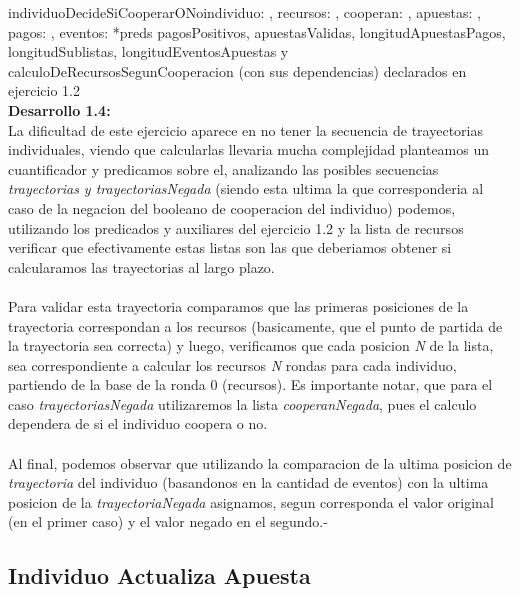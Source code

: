 \documentclass[10pt,a4paper]{article}
\begin{document}
\begin{proc}{individuoDecideSiCooperarONo}{\In individuo: \nat, \In recursos: \TLista{\float}, \Inout cooperan: \TLista{\bool}, \In apuestas: \TLista{\TLista{\float}}, \In pagos: \TLista{\float}, \In eventos: \TLista{\TLista{\nat}}}{}
    *preds pagosPositivos, apuestasValidas, longitudApuestasPagos, longitudSublistas, longitudEventosApuestas y calculoDeRecursosSegunCooperacion (con sus dependencias) declarados en ejercicio 1.2
\\
\textbf{Desarrollo 1.4:}
\\
 La dificultad de este ejercicio aparece en no tener la secuencia de trayectorias individuales, viendo que calcularlas llevaria mucha complejidad planteamos un cuantificador y predicamos sobre el, analizando las posibles secuencias \textit{trayectorias y trayectoriasNegada} (siendo esta ultima la que corresponderia al caso de la negacion del booleano de cooperacion del individuo) podemos, utilizando los predicados y auxiliares del ejercicio 1.2 y la lista de recursos verificar que efectivamente estas listas son las que deberiamos obtener si calcularamos las trayectorias al largo plazo. \\ \\
Para validar esta trayectoria comparamos que las primeras posiciones de la trayectoria correspondan a los recursos (basicamente, que el punto de partida de la trayectoria sea correcta) y luego, verificamos que cada posicion \textit{N} de la lista, sea correspondiente a calcular los recursos \textit{N} rondas para cada individuo, partiendo de la base de la ronda 0 (recursos). Es importante notar, que para el caso \textit{trayectoriasNegada} utilizaremos la lista \textit{cooperanNegada}, pues el calculo dependera de si el individuo coopera o no.
\\ \\
Al final, podemos observar que utilizando la comparacion de la ultima posicion de \textit{trayectoria} del individuo (basandonos en la cantidad de eventos) con la ultima posicion de la \textit{trayectoriaNegada} asignamos, segun corresponda el valor original (en el primer caso) y el valor negado en el segundo.-


\end{proc}

\subsection{Individuo Actualiza Apuesta}
\end{document}
